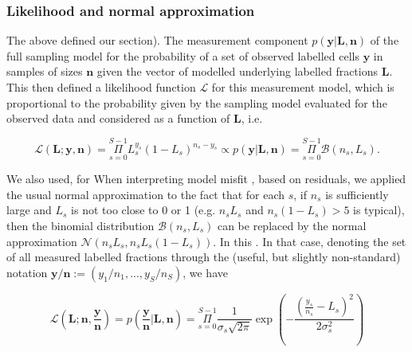 \documentclass[10pt,letterpaper]{article}
\providecommand{\DIFaddtex}[1]{{\protect\color{blue} \sf #1}} %
\providecommand{\DIFdeltex}[1]{{\protect\color{red} \scriptsize #1}} %
\providecommand{\DIFaddbegin}{} %
\providecommand{\DIFaddend}{} %
\providecommand{\DIFdelbegin}{} %
\providecommand{\DIFdelend}{} %
\providecommand{\DIFadd}[1]{\texorpdfstring{\DIFaddtex{#1}}{#1}} %
\providecommand{\DIFdel}[1]{\texorpdfstring{\DIFdeltex{#1}}{}} %
\begin{document}
\subsubsection{\DIFdel{Likelihood and normal
approximation}}%
\addtocounter{subsubsection}{-1}%

\DIFdel{The
above defined our }\DIFdelend \DIFaddbegin \DIFadd{section). The
}\DIFaddend measurement component \(p(\mathbf{y}|\mathbf{L},\mathbf{n})\) \DIFdelbegin \DIFdel{of the full sampling model for
the probability of a set of observed labelled cells \(\mathbf{y}\) in
samples of sizes \(\mathbf{n}\) given the vector of modelled underlying
labelled fractions \(\mathbf{L}\). This }\DIFdelend then
defined a likelihood function \(\mathcal{L}\) for this measurement
model,
\DIFdelbegin \DIFdel{which is
proportional to the probability given by the sampling model evaluated
for the observed data and considered as a function of \(\mathbf{L}\),
i.e.
}\DIFdelend 

\begin{equation}\mathcal{L}(\mathbf{L};\mathbf{y},\mathbf{n}) = \underset{s=0}{\overset{S-1}{\Pi}}
L_s^{y_s}(1-L_s)^{n_s-y_s} \propto p(\mathbf{y}|\mathbf{L},\mathbf{n}) = \underset{s=0}{\overset{S-1}{\Pi}}\mathcal{B}(n_s,L_s).\label{eq:likel-binom}\end{equation}

\DIFdelbegin \DIFdel{We also used, for }\DIFdelend \DIFaddbegin \DIFadd{When }\DIFaddend interpreting model misfit \DIFdelbegin \DIFdel{, }\DIFdelend \DIFaddbegin \DIFadd{based on residuals, we applied the usual
normal approximation to }\DIFaddend the \DIFdelbegin \DIFdel{fact that for each
\(s\), if \(n_s\) is sufficiently large and \(L_s\) is not too close to 0 or 1 (e.g. \(n_sL_s\) and \(n_s(1-L_s) > 5\) is typical), then the
}\DIFdelend binomial distribution\DIFdelbegin \DIFdel{\(\mathcal{B}(n_s,L_s)\) can be replaced by the
normal approximation \(\mathcal{N}(n_sL_s,n_sL_s(1-L_s))\). In this
}\DIFdelend \DIFaddbegin \DIFadd{. In that }\DIFaddend case,
denoting the set of all measured labelled fractions through the (useful,
but slightly non-standard) notation
\(\mathbf{y}/\mathbf{n} := (y_1/n_1,...,y_S/n_S)\), \DIFaddbegin \DIFadd{we have
}\DIFaddend 

\begin{equation}\mathcal{L}(\mathbf{L};\mathbf{n},\frac{\mathbf{y}}{\mathbf{n}}) = p(\frac{\mathbf{y}}{\mathbf{n}}|\mathbf{L},\mathbf{n}) =
\underset{s=0}{\overset{S-1}{\Pi}} \frac{1}{\sigma_s
\sqrt{2\pi}}\exp{(-\frac{(\frac{y_s}{n_s}-L_s)^2}{2\sigma_s^2})}\label{eq:likel-norma}\end{equation}
\end{document}
